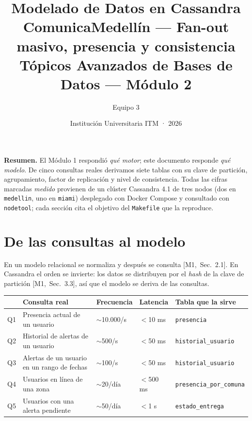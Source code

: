 \documentclass[11pt,a4paper]{article}
\title{\vspace{-1.5cm}
  \textcolor{itmazul}{\Large\textbf{Modelado de Datos en Cassandra}}\\[4pt]
  \large ComunicaMedellín — Fan-out masivo, presencia y consistencia\\[10pt]
  \normalsize Tópicos Avanzados de Bases de Datos — Módulo 2}
\author{\normalsize Equipo 3}
\date{\normalsize Institución Universitaria ITM · 2026}
\newcommand{\mI}[1]{\textcolor{acento}{\small[M1,~Sec.~#1]}}
\begin{document}
\maketitle
\vspace{-0.6cm}

\begin{center}
\begin{minipage}{0.95\textwidth}\small
\textbf{Resumen.} El Módulo 1 respondió \emph{qué motor}; este documento responde
\emph{qué modelo}. De cinco consultas reales derivamos siete tablas con su clave de
partición, agrupamiento, factor de replicación y nivel de consistencia. Todas las
cifras marcadas \emph{medido} provienen de un clúster Cassandra 4.1 de tres nodos
(dos en \texttt{medellin}, uno en \texttt{miami}) desplegado con Docker Compose y
consultado con \texttt{nodetool}; cada sección cita el objetivo del
\texttt{Makefile} que la reproduce.
\end{minipage}
\end{center}
\vspace{2pt}

\section{De las consultas al modelo}
En un modelo relacional se normaliza y después se consulta \mI{2.1}. En Cassandra
el orden se invierte: los datos se distribuyen por el \emph{hash} de la clave de
partición \mI{3.3}, así que el modelo se deriva de las consultas.

\begin{center}\small
\begin{tabular}{@{}p{0.7cm}p{6.1cm}p{2.3cm}p{1.7cm}p{2.9cm}@{}}
\toprule
& \textbf{Consulta real} & \textbf{Frecuencia} & \textbf{Latencia} & \textbf{Tabla que la sirve} \\
\midrule
Q1 & Presencia actual de un usuario & $\sim$10.000/s & $<$10 ms & \texttt{presencia} \\
Q2 & Historial de alertas de un usuario & $\sim$500/s & $<$50 ms & \texttt{historial\_usuario} \\
Q3 & Alertas de un usuario en un rango de fechas & $\sim$100/s & $<$50 ms & \texttt{historial\_usuario} \\
Q4 & Usuarios en línea de una zona & $\sim$20/día & $<$500 ms & \texttt{presencia\_por\_comuna} \\
Q5 & Usuarios con una alerta pendiente & $\sim$50/día & $<$1 s & \texttt{estado\_entrega} \\
\bottomrule
\end{tabular}
\end{center}
\end{document}
